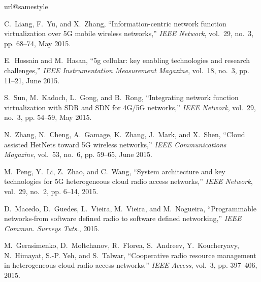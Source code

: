 \documentclass[conference]{IEEEtran}
\begin{document}
\begin{thebibliography}{10}
	\providecommand{\url}[1]{#1}
	\csname url@samestyle\endcsname
	\providecommand{\newblock}{\relax}
	\providecommand{\bibinfo}[2]{#2}
	\providecommand{\BIBentrySTDinterwordspacing}{\spaceskip=0pt\relax}
	\providecommand{\BIBentryALTinterwordstretchfactor}{4}
	\providecommand{\BIBentryALTinterwordspacing}{\spaceskip=\fontdimen2\font plus
		\BIBentryALTinterwordstretchfactor\fontdimen3\font minus
		\fontdimen4\font\relax}
	\providecommand{\BIBforeignlanguage}[2]{{\expandafter\ifx\csname l@#1\endcsname\relax
			\typeout{** WARNING: IEEEtran.bst: No hyphenation pattern has been}\typeout{** loaded for the language `#1'. Using the pattern for}\typeout{** the default language instead.}\else
			\language=\csname l@#1\endcsname
			\fi
			#2}}
	\providecommand{\BIBdecl}{\relax}
	\BIBdecl
	
	C.~Liang, F.~Yu, and X.~Zhang, ``Information-centric network function
	virtualization over {5G} mobile wireless networks,'' \emph{IEEE Network},
	vol.~29, no.~3, pp. 68--74, May 2015.
	
	E.~Hossain and M.~Hasan, ``5g cellular: key enabling technologies and research
	challenges,'' \emph{IEEE Instrumentation Measurement Magazine}, vol.~18,
	no.~3, pp. 11--21, June 2015.
	
	S.~Sun, M.~Kadoch, L.~Gong, and B.~Rong, ``Integrating network function
	virtualization with {SDR} and {SDN} for {4G/5G} networks,'' \emph{IEEE
		Network}, vol.~29, no.~3, pp. 54--59, May 2015.
	
	N.~Zhang, N.~Cheng, A.~Gamage, K.~Zhang, J.~Mark, and X.~Shen, ``Cloud assisted
	{HetNets} toward {5G} wireless networks,'' \emph{IEEE Communications
		Magazine}, vol.~53, no.~6, pp. 59--65, June 2015.
	
	M.~Peng, Y.~Li, Z.~Zhao, and C.~Wang, ``System architecture and key
	technologies for {5G} heterogeneous cloud radio access networks,'' \emph{IEEE
		Network}, vol.~29, no.~2, pp. 6--14, 2015.
	
	D.~Macedo, D.~Guedes, L.~Vieira, M.~Vieira, and M.~Nogueira, ``Programmable
	networks-from software defined radio to software defined networking,''
	\emph{{IEEE} Commun. Surveys Tuts.}, 2015.
	
	M.~Gerasimenko, D.~Moltchanov, R.~Florea, S.~Andreev, Y.~Koucheryavy,
	N.~Himayat, S.-P. Yeh, and S.~Talwar, ``Cooperative radio resource management
	in heterogeneous cloud radio access networks,'' \emph{IEEE Access}, vol.~3,
	pp. 397--406, 2015.
	

\end{thebibliography}
\end{document}
